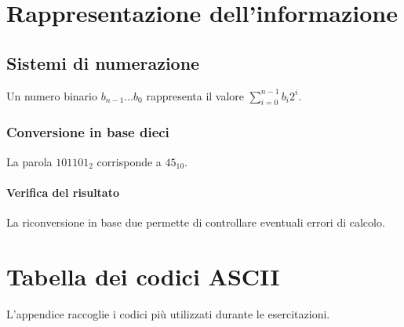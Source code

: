 \documentclass{../../../unipd-notes}
\begin{document}
\tableofcontents
\chapter{Rappresentazione dell'informazione}
\section{Sistemi di numerazione}
Un numero binario $b_{n-1}\dots b_0$ rappresenta il valore $\sum_{i=0}^{n-1}b_i2^i$.
\subsection{Conversione in base dieci}
La parola $101101_2$ corrisponde a $45_{10}$.
\subsubsection{Verifica del risultato}
La riconversione in base due permette di controllare eventuali errori di calcolo.
\courseappendices
\chapter{Tabella dei codici ASCII}
L'appendice raccoglie i codici più utilizzati durante le esercitazioni.
\end{document}
